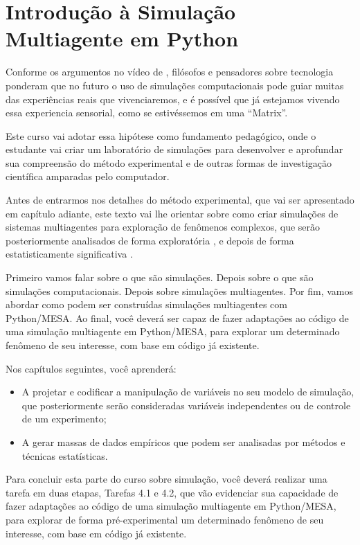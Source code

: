 \chapter{Introdução à Simulação Multiagente em Python}

Conforme os argumentos no vídeo de \citet{crashcourse_controlled_2018}, filósofos e pensadores sobre tecnologia ponderam que no futuro o uso de simulações computacionais pode guiar muitas das experiências reais que vivenciaremos, e é possível que já estejamos vivendo essa experiencia sensorial, como se estivéssemos em uma ``Matrix''.

Este curso vai adotar essa hipótese como fundamento pedagógico, onde o estudante vai criar um laboratório de simulações para desenvolver e aprofundar sua compreensão do método experimental e de outras formas de investigação científica amparadas pelo computador.

Antes de entrarmos nos detalhes do método experimental, que vai ser apresentado em capítulo adiante, este texto vai lhe orientar sobre como criar simulações de sistemas multiagentes para exploração de fenômenos complexos, que serão posteriormente analisados de forma exploratória \citep{wickham_r_2016}, e depois de forma estatisticamente significativa \citep{goldstein_choosing_2015}.

Primeiro vamos falar sobre o que são simulações.
Depois sobre o que são simulações computacionais.
Depois sobre simulações multiagentes.
Por fim, vamos abordar como podem ser construídas simulações multiagentes com Python/MESA.
Ao final, você deverá ser capaz de fazer adaptações ao código de uma simulação multiagente em Python/MESA, para explorar um determinado fenômeno de seu interesse, com base em código já existente.

Nos capítulos seguintes, você aprenderá:
\begin{itemize}
    \item A projetar e codificar a manipulação de variáveis no seu modelo de simulação, que posteriormente serão consideradas variáveis independentes ou de controle de um experimento;
    \item A gerar massas de dados empíricos que podem ser analisadas por métodos e técnicas estatísticas.
\end{itemize}

Para concluir esta parte do curso sobre simulação, você deverá realizar uma tarefa em duas etapas, Tarefas 4.1 e 4.2, que vão evidenciar sua capacidade de fazer adaptações ao código de uma simulação multiagente em Python/MESA, para explorar de forma pré-experimental um determinado fenômeno de seu interesse, com base em código já existente.

